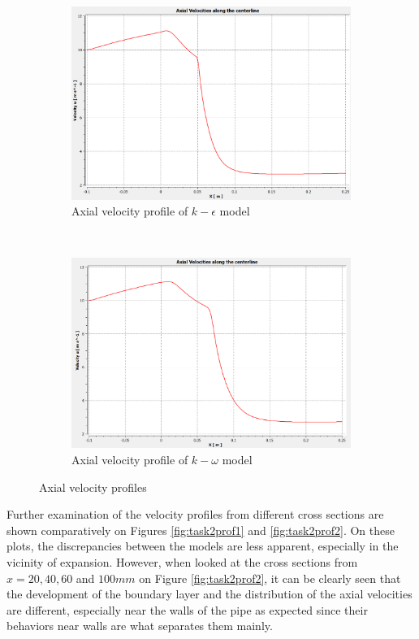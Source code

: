 \begin{figure}[H]
    \centering
    \begin{subfigure}{.45\textwidth}
    \centering
    \includegraphics[width=.9\linewidth]{images/task2/task2-1/axial.png}
    \caption{Axial velocity profile of $k-\epsilon$ model}
    \label{fig:task2mesh}
    \end{subfigure}
    ~
\begin{subfigure}{.45\textwidth}
    \centering
    \includegraphics[width=.9\linewidth]{images/task2/task2-2/axials.png}
    \caption{Axial velocity profile of $k-\omega$ model}
    \label{fig:task2_residuals}
\end{subfigure}
    \caption{Axial velocity profiles}
    \label{fig:axial_task2}
\end{figure}


\noindent Further examination of the velocity profiles from different cross sections are shown comparatively on Figures \ref{fig:task2prof1} and \ref{fig:task2prof2}. On these plots, the discrepancies between the models are less apparent, especially in the vicinity of expansion. However, when looked at the cross sections from $x=20, 40, 60$ and $100 mm$ on Figure \ref{fig:task2prof2}, it can be clearly seen that the development of the boundary layer and the distribution of the axial velocities are different, especially near the walls of the pipe as expected since their behaviors near walls are what separates them mainly. \\


